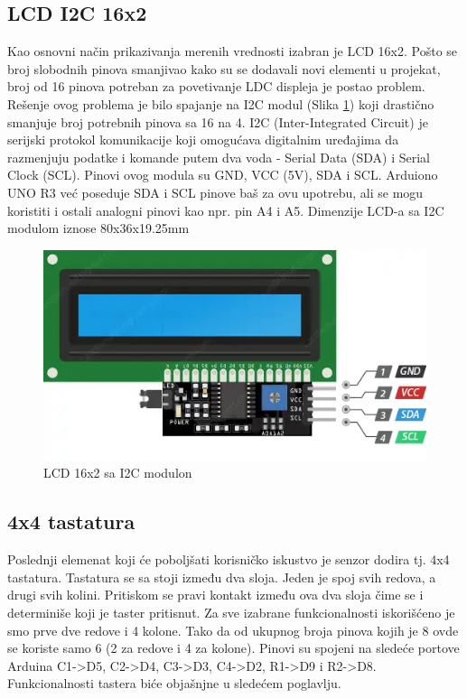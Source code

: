 \documentclass[a4paper, 12pt]{article}
\begin{document}
\vspace{10pt}

\pagebreak

	\subsection{LCD I2C 16x2}
	
	Kao osnovni način prikazivanja merenih vrednosti izabran je LCD 16x2. Pošto se broj slobodnih pinova smanjivao kako su se dodavali novi elementi u projekat, broj od 16 pinova potreban za povetivanje LDC displeja je postao problem. Rešenje ovog problema je bilo spajanje na I2C modul (Slika \ref{fig:I2CLCD}) koji drastično smanjuje broj potrebnih pinova sa 16 na 4. I2C (Inter-Integrated Circuit) je serijski protokol komunikacije koji omogućava digitalnim uređajima da razmenjuju podatke i komande putem dva voda - Serial Data (SDA) i Serial Clock (SCL). Pinovi ovog modula su GND, VCC (5V), SDA i SCL. Arduiono UNO R3 već poseduje SDA i SCL pinove baš za ovu upotrebu, ali se mogu koristiti i ostali analogni pinovi kao npr. pin A4 i A5. Dimenzije LCD-a sa I2C modulom iznose 80x36x19.25mm
	
	\begin{figure}[H]
\centering
\includegraphics[scale=0.6]{images/I2CLCD}
\caption{LCD 16x2 sa I2C modulon} \label{fig:I2CLCD}
\end{figure}
	


	\subsection{4x4 tastatura}
	
	Poslednji elemenat koji će poboljšati korisničko iskustvo je senzor dodira tj. 4x4 tastatura. Tastatura se sa stoji između dva sloja. Jeden je spoj svih redova, a drugi svih kolini. Pritiskom se pravi kontakt između ova dva sloja čime se i determiniše koji je taster pritisnut. Za sve izabrane funkcionalnosti iskorišćeno je smo prve dve redove i 4 kolone. Tako da od ukupnog broja pinova kojih je 8 ovde se koriste samo 6 (2 za redove i 4 za kolone). Pinovi su spojeni na sledeće portove Arduina C1->D5, C2->D4, C3->D3, C4->D2, R1->D9 i R2->D8. Funkcionalnosti tastera biće objašnjne u sledećem poglavlju.
	
\end{document}
